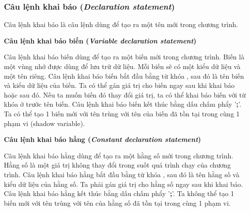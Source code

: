 \subsubsection{Câu lệnh khai báo (\textit{Declaration statement})}

\regexdeclstmt

Câu lệnh khai báo là câu lệnh dùng để tạo ra một tên mới trong chương trình. 

\noindent\textbf{\label{ch2:decl_var_stmt}Câu lệnh khai báo biến (\textit{Variable declaration statement})}

\regexvardeclstmt

Câu lệnh khai báo biến dùng để tạo ra một biến mới trong chương trình. Biến là một vùng nhớ được dùng để lưu trữ dữ liệu. Mỗi biến sẽ có một kiểu dữ liệu và một tên riêng. Câu lệnh khai báo biến bắt đầu bằng từ khóa , sau đó là tên biến và kiểu dữ liệu của biến. Ta có thể gán giá trị cho biến ngay sau khi khai báo hoặc sau đó. Nếu ta muốn biến đó thay đổi giá trị, ta có thể khai báo biến với từ khóa  ở trước tên biến. Câu lệnh khai báo biến kết thúc bằng dấu chấm phẩy '\textbf{;}'. Ta có thể tạo 1 biến mới với tên trùng với tên của biến đã tồn tại trong cùng 1 phạm vi (shadow variable).

\noindent\textbf{\label{ch2:decl_const_stmt}Câu lệnh khai báo hằng (\textit{Constant declaration statement})}

\regexconstdeclstmt

Câu lệnh khai báo hằng dùng để tạo ra một hằng số mới trong chương trình. Hằng số là một giá trị không thay đổi trong suốt quá trình chạy của chương trình. Câu lệnh khai báo hằng bắt đầu bằng từ khóa , sau đó là tên hằng số và kiểu dữ liệu của hằng số. Ta phải gán giá trị cho hằng số ngay sau khi khai báo. Câu lệnh khai báo hằng kết thúc bằng dấu chấm phẩy '\textbf{;}'. Ta không thể tạo 1 biến mới với tên trùng với tên của hằng số đã tồn tại trong cùng 1 phạm vi.
